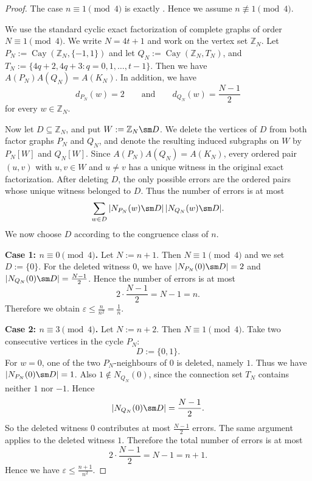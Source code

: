 \documentclass{file}
\newcommand{\eps}{\varepsilon}
\newcommand{\Cay}{\operatorname{Cay}}
\begin{document}
\begin{proof}
The case $n\equiv 1\pmod 4$ is exactly
.  Hence we assume $n\not\equiv 1\pmod 4$.

We use the standard cyclic exact factorization of complete graphs of order $N\equiv 1\pmod 4$.  
We write $N=4t+1$ and work on the vertex set $\mathbb Z_N$.  
Let $P_N:=\Cay(\mathbb Z_N,\{-1,1\})$
and let $Q_N:=\Cay(\mathbb Z_N,T_N)$, and $T_N:=\{4q+2,4q+3:q=0,1,\dots,t-1\}$.
Then we have $A(P_N)A(Q_N)=A(K_N)$.
In addition, we have 
\[
  d_{P_N}(w)=2
  \qquad\text{and}\qquad
  d_{Q_N}(w)=\frac{N-1}{2}
\]
for every $w\in\mathbb Z_N$.

Now let $D\subseteq \mathbb Z_N$, and put $W:=\mathbb Z_N\sm   D$.
We delete the vertices of $D$ from both factor graphs $P_N$ and $Q_N$, and denote the resulting induced subgraphs on $W$ by $P_N[W]$ and $Q_N[W]$.
Since $A(P_N)A(Q_N)=A(K_N)$, every ordered pair $(u,v)$ with $u,v\in W$ and $u\neq v$ has a unique witness in the original exact factorization.  
After deleting $D$, the only possible errors are the ordered pairs whose unique witness belonged to $D$.  
Thus the number of errors is at most
\[
  \sum_{w\in D}
  |N_{P_N}(w)\sm   D|\,
  |N_{Q_N}(w)\sm   D|.
\]
We now choose $D$ according to the congruence class of $n$.

\medskip
\noindent
\textbf{Case 1: $n\equiv 0\pmod 4$.}
Let $N:=n+1$.
Then $N\equiv 1\pmod 4$ and we set $D:=\{0\}$.
For the deleted witness $0$, we have $|N_{P_N}(0)\sm   D|=2$ and $|N_{Q_N}(0)\sm   D|=\frac{N-1}{2}$.
Hence the number of errors is at most
\[
  2\cdot \frac{N-1}{2}
  =
  N-1
  =
  n.
\]
Therefore we obtain $\eps\le \frac{n}{n^2}=\frac1n$.

\medskip
\noindent
\textbf{Case 2: $n\equiv 3\pmod 4$.}
Let $N:=n+2$.
Then $N\equiv 1\pmod 4$.  
Take two consecutive vertices in the cycle $P_N$:
\[
  D:=\{0,1\}.
\]
For $w=0$, one of the two $P_N$-neighbours of $0$ is deleted, namely $1$.
Thus we have $|N_{P_N}(0)\sm   D|=1$.
Also $1\notin N_{Q_N}(0)$, since the connection set $T_N$ contains neither
$1$ nor $-1$.  Hence
\[
  |N_{Q_N}(0)\sm   D|=\frac{N-1}{2}.
\]
So the deleted witness $0$ contributes at most $\frac{N-1}{2}$ errors.  
The same argument applies to the deleted witness $1$.  Therefore the total number of errors is at most
\[
  2\cdot \frac{N-1}{2}
  =
  N-1
  =
  n+1.
\]
Hence we have $\eps\le \frac{n+1}{n^2}$.


\end{proof}
\end{document}
